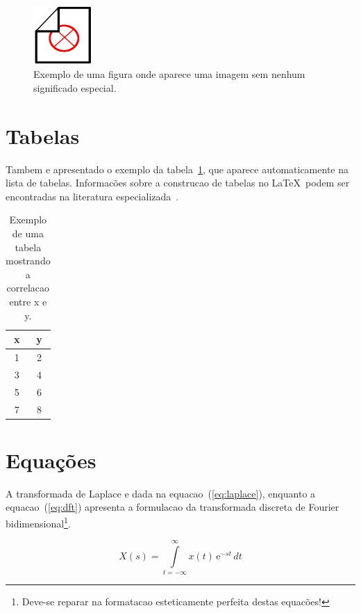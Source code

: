 \documentclass[openright]{normas-utf-tex} %
\begin{document}
\begin{figure}[!htb]
	\centering
	\includegraphics[width=0.2\textwidth]{./dummy.png} %
	\caption[Figure example]{Exemplo de uma figura onde aparece uma imagem sem nenhum significado especial.}
	\label{fig:dummy}
\end{figure}


\section{Tabelas}

Tambem e apresentado o exemplo da tabela~\ref{tab:correlacao}, que aparece automaticamente na lista de tabelas. Informac\~oes sobre a construcao de tabelas no \LaTeX\ podem ser encontradas na literatura especializada~\cite{Lamport1986,Buerger1989,Kopka2003,Mittelbach2004}.

\begin{table}[!htb]
	\centering
	\caption[Table example]{Exemplo de uma tabela mostrando a correlacao entre x e y.}
	\label{tab:correlacao}
	\begin{tabular}{cc}
		\hline 
		x & y \\
		\hline
		1 & 2 \\
		3 & 4 \\
		5 & 6 \\
		7 & 8 \\
		\hline 
	\end{tabular}
\end{table}

\section{Equações}

A transformada de Laplace e dada na equacao~(\ref{eq:laplace}), enquanto a equacao~(\ref{eq:dft}) apresenta a formulacao da transformada discreta de Fourier bidimensional\footnote{Deve-se reparar na formatacao esteticamente perfeita destas equac\~oes!}.

\begin{equation}
X(s) = \int\limits_{t = -\infty}^{\infty} x(t) \, \text{e}^{-st} \, dt
\label{eq:laplace}
\end{equation}
\end{document}
